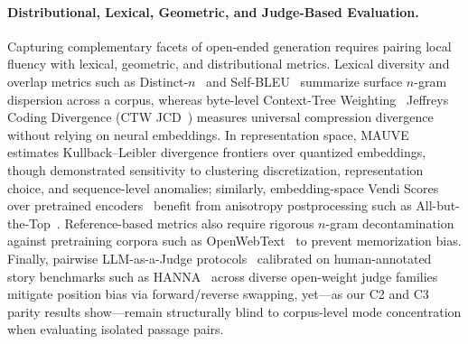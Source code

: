 \documentclass[11pt,a4paper]{article}
\begin{document}
\paragraph{Distributional, Lexical, Geometric, and Judge-Based Evaluation.}
Capturing complementary facets of open-ended generation requires pairing local fluency with lexical, geometric, and distributional metrics. Lexical diversity and overlap metrics such as Distinct-$n$~\citep{li2016diversity} and Self-BLEU~\citep{zhu2018texygen} summarize surface $n$-gram dispersion across a corpus, whereas byte-level Context-Tree Weighting~\citep{willems1995context} Jeffreys Coding Divergence (CTW JCD~\citep{franca2026hacking}) measures universal compression divergence without relying on neural embeddings. In representation space, MAUVE~\citep{pillutla2021mauve} estimates Kullback--Leibler divergence frontiers over quantized embeddings, though \citet{pimentel2023usefulness} demonstrated sensitivity to clustering discretization, representation choice, and sequence-level anomalies; similarly, embedding-space Vendi Scores~\citep{friedman2023vendi} over pretrained encoders~\citep{reimers2019sentence,xiao2024cpack} benefit from anisotropy postprocessing such as All-but-the-Top~\citep{mu2018all}. Reference-based metrics also require rigorous $n$-gram decontamination~\citep{brown2020language} against pretraining corpora such as OpenWebText~\citep{gokaslan2019openwebtext} to prevent memorization bias. Finally, pairwise LLM-as-a-Judge protocols~\citep{zheng2023judging} calibrated on human-annotated story benchmarks such as HANNA~\citep{chhun2022hanna} across diverse open-weight judge families~\citep{yang2025qwen25,grattafiori2024llama3,jiang2023mistral7b} mitigate position bias via forward/reverse swapping, yet---as our C2 and C3 parity results show---remain structurally blind to corpus-level mode concentration when evaluating isolated passage pairs.
\end{document}
